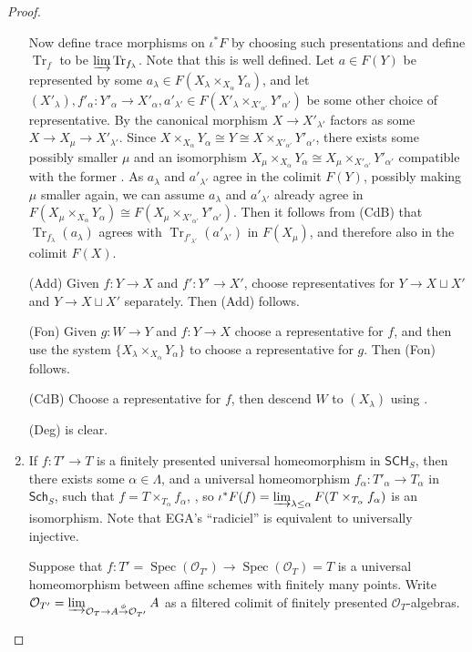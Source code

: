 \documentclass[10pt]{amsart}
\theoremstyle{definition}
\newcommand{\OO}{\mathcal{O}}
\DeclareMathOperator{\Spec}{Spec}
\DeclareMathOperator{\Tr}{Tr}
\newcommand{\Sch}{\mathsf{Sch}}
\newcommand{\SCH}{\mathsf{SCH}}
\begin{document}
\begin{proof}
\begin{enumerate}
Now define trace morphisms on $\iota^*F$ by choosing such presentations and define $\Tr_f$ to be $\varinjlim \Tr_{f_\lambda}$. Note that this is well defined. Let $a \in F(Y)$ be represented by some $a_\lambda \in F(X_\lambda \times_{X_\alpha} Y_\alpha)$, and let $(X'_\lambda), f'_\alpha: Y'_\alpha \to X'_\alpha, a'_{\lambda'} \in F(X'_\lambda \times_{X'_{\alpha'}} Y'_{\alpha'})$ be some other choice of representative. By \cite[Prop.8.13.1]{EGAIV3} the canonical morphism $X \to X'_{\lambda'}$ factors as some $X \to X_\mu \to X'_{\lambda'}$. Since $X {\times_{X_\alpha}} Y_\alpha \cong Y \cong X {\times_{X'_{\alpha'}}} Y'_{\alpha'}$, there exists some possibly smaller $\mu$ and an isomorphism $X_\mu \times_{X_\alpha} Y_\alpha \cong X_\mu {\times_{X'_{\alpha'}}} Y'_{\alpha'}$ compatible with the former \cite[Thm.8.8.2(i)]{EGAIV3}. As $a_\lambda$ and $a'_{\lambda'}$ agree in the colimit $F(Y)$, possibly making $\mu$ smaller again, we can assume $a_\lambda$ and $a'_{\lambda'}$ already agree in $F(X_\mu \times_{X_\alpha} Y_\alpha) \cong F(X_\mu {\times_{X'_{\alpha'}}} Y'_{\alpha'})$. Then it follows from (CdB) that $\Tr_{f_\lambda}(a_\lambda)$ agrees with $\Tr_{f'_{\lambda'}}(a'_{\lambda'})$ in $F(X_\mu)$, and therefore also in the colimit $F(X)$. 

(Add) Given $f: Y \to X$ and $f': Y' \to X'$, choose representatives for $Y \to X \sqcup X'$ and $Y \to X \sqcup X'$ separately. Then (Add) follows.

(Fon) Given $g: W \to Y$ and $f: Y \to X$ choose a representative for $f$, and then use the system $\{X_\lambda \times_{X_\alpha} Y_\alpha\}$ to choose a representative for $g$. Then (Fon) follows.

(CdB) Choose a representative for $f$, then descend $W$ to $(X_\lambda)$ using \cite[Thm.8.8.2(ii)]{EGAIV3}.

(Deg) is clear.

 \item If $f: T' \to T$ is a finitely presented universal homeomorphism in $\SCH_S$, then there exists some $\alpha \in \Lambda$, and a universal homeomorphism $f_\alpha: T'_\alpha \to T_\alpha$ in $\Sch_S$, such that $f = T \times_{T_\alpha} f_\alpha$, \cite[Thm.8.8.2(ii),Thm.8.10.5(vi)(vii)(viii)]{EGAIV3}, so $\iota^*F(f) = \varinjlim_{\lambda \leq \alpha} F(T \times_{T_\alpha} f_\alpha)$ is an isomorphism. Note that EGA’s ``radiciel'' is equivalent to universally injective.
 
 Suppose that $f: T' = \Spec(\OO_{T'}) \to \Spec(\OO_{T}) = T$ is a universal homeomorphism between affine schemes with finitely many points. Write $\OO_{T'} = \varinjlim_{\OO_T \to A \stackrel{\phi}{\to} \OO_{T'}} A$ as a filtered colimit of finitely presented $\OO_T$-algebras.
 

\end{enumerate}
\end{proof}
\end{document}
